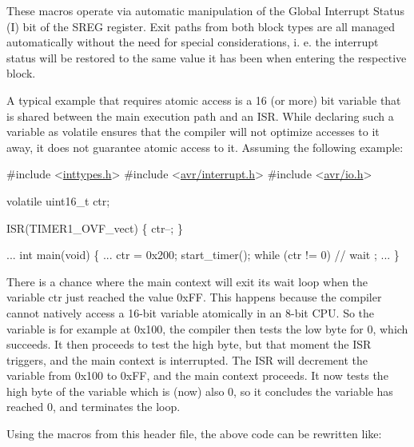 These macros operate via automatic manipulation of the Global Interrupt Status (I) bit of the S\+R\+EG register. Exit paths from both block types are all managed automatically without the need for special considerations, i. e. the interrupt status will be restored to the same value it has been when entering the respective block.

A typical example that requires atomic access is a 16 (or more) bit variable that is shared between the main execution path and an I\+SR. While declaring such a variable as volatile ensures that the compiler will not optimize accesses to it away, it does not guarantee atomic access to it. Assuming the following example\+:


\begin{DoxyCode}
\textcolor{preprocessor}{#include <\hyperlink{inttypes_8h}{inttypes.h}>}
\textcolor{preprocessor}{#include <\hyperlink{interrupt_8h}{avr/interrupt.h}>}
\textcolor{preprocessor}{#include <\hyperlink{io_8h}{avr/io.h}>}

\textcolor{keyword}{volatile} uint16\_t ctr;

ISR(TIMER1\_OVF\_vect)
\{
  ctr--;
\}

...
int
main(\textcolor{keywordtype}{void})
\{
   ...
   ctr = 0x200;
   start\_timer();
   \textcolor{keywordflow}{while} (ctr != 0)
     \textcolor{comment}{// wait}
       ;
   ...
\}
\end{DoxyCode}


There is a chance where the main context will exit its wait loop when the variable {\ttfamily ctr} just reached the value 0x\+FF. This happens because the compiler cannot natively access a 16-\/bit variable atomically in an 8-\/bit C\+PU. So the variable is for example at 0x100, the compiler then tests the low byte for 0, which succeeds. It then proceeds to test the high byte, but that moment the I\+SR triggers, and the main context is interrupted. The I\+SR will decrement the variable from 0x100 to 0x\+FF, and the main context proceeds. It now tests the high byte of the variable which is (now) also 0, so it concludes the variable has reached 0, and terminates the loop.

Using the macros from this header file, the above code can be rewritten like\+:


